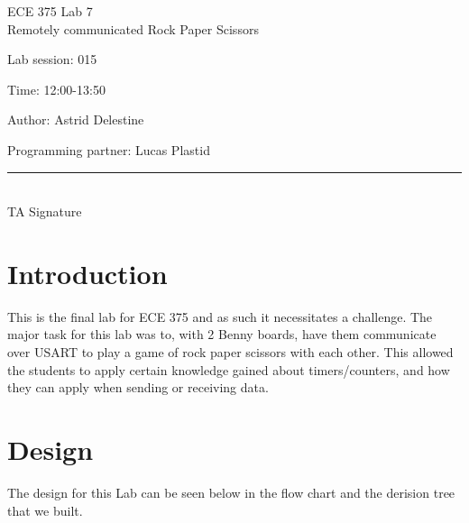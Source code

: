 \documentclass[12pt,letterpaper]{article}
\begin{document}
\begin{titlepage}
    \vspace*{4cm}
    \begin{flushright}
    {\huge
        ECE 375 Lab 7\\[1cm]
    }
    {\large
    	Remotely communicated Rock Paper Scissors
    }
    \end{flushright}
    \begin{flushleft}
    Lab session: 015
    
    Time: 12:00-13:50
    \end{flushleft}
    \begin{flushright}
    Author: Astrid Delestine

    Programming partner: Lucas Plastid 

    \vfill
    \rule{5in}{.5mm}\\
    TA Signature
    \end{flushright}

\end{titlepage}

\section{Introduction}
This is the final lab for ECE 375 and as such it necessitates a challenge. The major task for this lab was to, with 2 Benny boards, have them communicate over USART to play a game of rock paper scissors with each other. This allowed the students to apply certain knowledge gained about timers/counters, and how they can apply when sending or receiving data.


\section{Design}
The design for this Lab can be seen below in the flow chart and the derision tree that we built.
\end{document}
